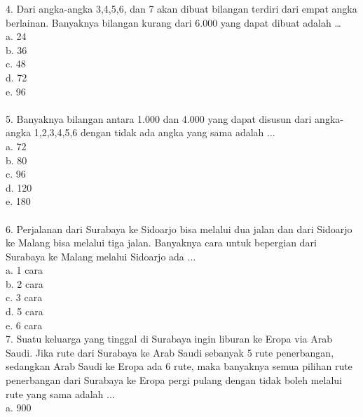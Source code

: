 \documentclass[11pt,fleqn]{book} %
\begin{document}
4. Dari angka-angka 3,4,5,6, dan 7 akan dibuat bilangan terdiri dari empat angka berlainan. Banyaknya bilangan kurang dari 6.000 yang dapat dibuat adalah …\\ 

a.	24\\

b.	36\\

c.	48\\

d.	72\\

e.	96\\
\\

5. Banyaknya bilangan antara 1.000 dan 4.000 yang dapat disusun dari angka-angka 1,2,3,4,5,6 dengan tidak ada angka yang sama adalah ...\\

a.	72\\

b.	80\\

c.	96\\

d.	120\\

e.	180\\
\\

6. Perjalanan dari Surabaya ke Sidoarjo bisa melalui dua jalan dan dari Sidoarjo ke Malang bisa melalui tiga jalan. Banyaknya cara untuk bepergian dari Surabaya ke Malang melalui Sidoarjo ada ...\\

a.	1 cara\\

b.	2 cara\\

c.	3 cara\\

d.	5 cara\\

e.	6 cara\\

7. Suatu keluarga yang tinggal di Surabaya ingin liburan ke Eropa via Arab Saudi. Jika rute dari Surabaya ke Arab Saudi sebanyak 5 rute penerbangan, sedangkan Arab Saudi ke Eropa ada 6 rute, maka banyaknya semua pilihan rute penerbangan dari Surabaya ke Eropa pergi pulang dengan tidak boleh melalui rute yang sama adalah ...\\

a.	900\\
\end{document}
